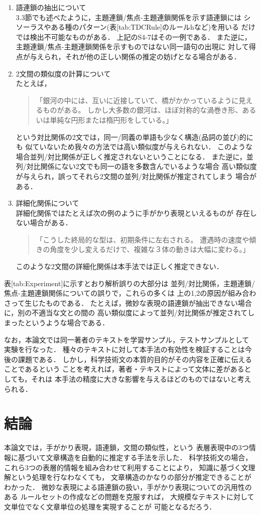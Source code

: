 \begin{enumerate}
\item 語連鎖の抽出について \\
3.3節でも述べたように，主題連鎖/焦点-主題連鎖関係を示す語連鎖には
シソーラスやある種のパターン(表[tab:TDCRule]のルールhなど)を用いる
だけでは検出不可能なものがある．
上記のS4-7はその一例である．
また逆に，主題連鎖/焦点-主題連鎖関係を示すものではない同一語句の出現に
対して得点が与えられ，それが他の正しい関係の推定の妨げとなる場合がある．
\item 2文間の類似度の計算について \\
たとえば，
\begin{quote}
「銀河の中には、互いに近接していて、橋がかかっているように見えるものがある。
しかし大多数の銀河は、ほぼ対称的な渦巻き形、あるいは単純な円形または楕円形をしている。」
\end{quote}
という対比関係の2文では，同一/同義の単語も少なく構造(品詞の並び)的にも
似ていないため我々の方法では高い類似度が与えられない．
このような場合並列/対比関係が正しく推定されないということになる．
また逆に，並列/対比関係にない2文でも同一の語を多数含んでいるような場合
高い類似度が与えられ，誤ってそれら2文間の並列/対比関係が推定されてしまう
場合がある．
\item 詳細化関係について \\
詳細化関係ではたとえば次の例のように手がかり表現といえるものが
存在しない場合がある．
\begin{quote}
「こうした終局的な型は、初期条件に左右される。
遭遇時の速度や傾きの角度を少し変えるだけで、複雑な３体の動きは大幅に変わる。」
\end{quote}
このような2文間の詳細化関係は本手法では正しく推定できない．
\end{enumerate}
表[tab:Experiment]に示すとおり解析誤りの大部分は
並列/対比関係，主題連鎖/焦点-主題連鎖関係についての誤りで，これらの多くは
上の1,2の原因が組み合わさって生じたものである．
たとえば，微妙な表現の語連鎖が抽出できない場合に，別の不適当な文との間の
高い類似度によって並列/対比関係が推定されてしまったというような場合である．

なお，本論文では同一著者のテキストを学習サンプル，テストサンプルとして
実験を行なった．
種々のテキストに対して本手法の有効性を検証することは今後の課題である．
しかし，科学技術文の本質的目的がその内容を正確に伝えることであるという
ことを考えれば，著者・テキストによって文体に差があるとしても，それは
本手法の精度に大きな影響を与えるほどのものではないと考えられる．

\section{結論}

本論文では，手がかり表現，語連鎖，文間の類似性，という
表層表現中の3つ情報に基づいて文章構造を自動的に推定する手法を示した．
科学技術文の場合，
これら3つの表層的情報を組み合わせて利用することにより，
知識に基づく文理解という処理を行なわなくても，
文章構造のかなりの部分が推定できることがわかった．
微妙な表現による語連鎖の扱い，手がかり表現についての汎用性のある
ルールセットの作成などの問題を克服すれば，
大規模なテキストに対して文単位でなく文章単位の処理を実現することが
可能となるだろう．


